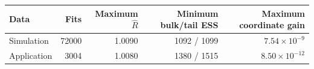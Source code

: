 \begin{tabular}{@{}lrrrr@{}}
\toprule
Data & Fits & Maximum $\widehat R$ & Minimum bulk/tail ESS & Maximum coordinate gain\\
\midrule
Simulation & 72000 & 1.0090 & 1092 / 1099 & $7.54\times10^{-9}$\\
Application & 3004 & 1.0080 & 1380 / 1515 & $8.50\times10^{-12}$\\
\bottomrule
\end{tabular}
